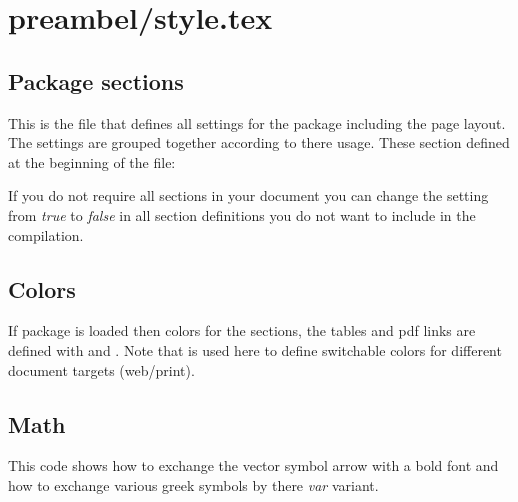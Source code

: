 
\section{preambel/style.tex}

\subsection{Package sections}

This is the file that defines all settings for the package including the page layout. The settings are grouped together according to there usage. 
These section defined at the beginning of the file:


If you do not require all sections in your document you can change the setting from \emph{true} to \emph{false} in all section definitions you do not want to include in the compilation.

\subsection{Colors}

If package  is loaded then colors for the sections, the tables and pdf links are defined with  and . Note that  is used here to define switchable colors for different document targets (web/print).


\subsection{Math}

This code shows how to exchange the vector symbol arrow with a bold font and how to exchange various greek symbols by there \emph{var} variant.


